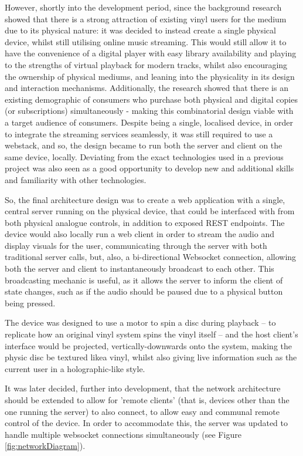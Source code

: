                 However, shortly into the development period, since the background research showed that there is a strong attraction of existing vinyl users for the medium due to its physical nature: it was decided to instead create a single physical device, whilst still utilising online music streaming. This would still allow it to have the convenience of a digital player with easy library availability and playing to the strengths of virtual playback for modern tracks, whilst also encouraging the ownership of physical mediums, and leaning into the physicality in its design and interaction mechanisms. Additionally, the research showed that there is an existing demographic of consumers who purchase both physical and digital copies (or subscriptions) simultaneously - making this combinatorial design viable with a target audience of consumers. Despite being a single, localised device, in order to integrate the streaming services seamlessly, it was still required to use a webstack, and so, the design became to run both the server and client on the same device, locally. Deviating from the exact technologies used in a previous project was also seen as a good opportunity to develop new and additional skills and familiarity with other technologies.
    
                So, the final architecture design was to create a web application with a single, central server running on the physical device, that could be interfaced with from both physical analogue controls, in addition to exposed REST endpoints. The device would also locally run a web client in order to stream the audio and display visuals for the user, communicating through the server with both traditional server calls, but, also, a bi-directional Websocket connection, allowing both the server and client to instantaneously broadcast to each other. This broadcasting mechanic is useful, as it allows the server to inform the client of state changes, such as if the audio should be paused due to a physical button being pressed.
                
                The device was designed to use a motor to spin a disc during playback -- to replicate how an original vinyl system spins the vinyl itself -- and the host client's interface would be projected, vertically-downwards onto the system, making the physic disc be textured likea vinyl, whilst also giving live information such as the current user in a holographic-like style.
    
                It was later decided, further into development, that the network architecture should be extended to allow for 'remote clients' (that is, devices other than the one running the server) to also connect, to allow easy and communal remote control of the device. In order to accommodate this, the server was updated to handle multiple websocket connections simultaneously (see Figure \ref{fig:networkDiagram}).
    
